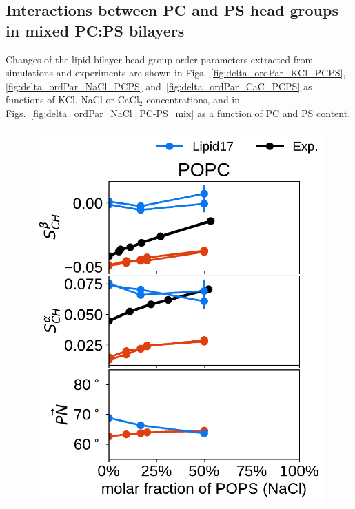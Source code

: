 \documentclass[journal=jpcbfk,manuscript=article]{achemso}
\newlength{\figheightsmall}
\newlength{\figheight}
\begin{document}
 
 
 
\subsection{Interactions between PC and PS head groups in mixed PC:PS bilayers}


Changes of the lipid bilayer head group order parameters extracted from simulations and 
experiments \cite{roux90} are shown in Figs.~\ref{fig:delta_ordPar_KCl_PCPS}, \ref{fig:delta_ordPar_NaCl_PCPS} 
and~\ref{fig:delta_ordPar_CaC_PCPS} as functions of KCl, NaCl or CaCl$_2$ concentrations,
and in Figs.~\ref{fig:delta_ordPar_NaCl_PC-PS_mix} as a function of PC and PS content. 



\begin{figure}[!tbp] 
  \centering 
  \includegraphics[height=\figheightsmall]{../Fig/order_parameters_changes_A-B_PC-PS_mix_POPC_nacl.pdf} 

\end{figure}
\end{document}
